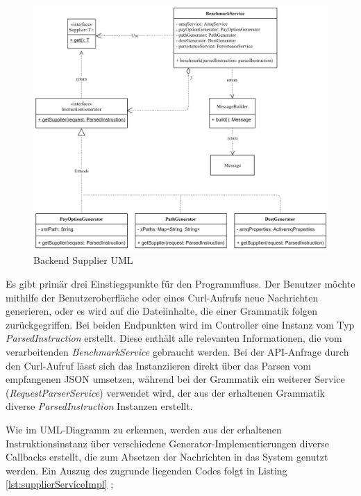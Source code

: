 \begin{figure}[ht!]
	\centering
	\includegraphics[width=\linewidth]{kapitel/problemloesung/implementierung/_img/supplier-uml}
	\caption[Backend Supplier UML]{Backend Supplier UML}
	\label{fig:supplierUml}
\end{figure}

Es gibt primär drei Einstiegspunkte für den Programmfluss. Der Benutzer möchte mithilfe der Benutzeroberfläche oder eines Curl-Aufrufs neue Nachrichten generieren, oder es wird auf die Dateiinhalte, die einer Grammatik folgen zurückgegriffen. Bei beiden Endpunkten wird im Controller eine Instanz vom Typ \emph{ParsedInstruction} erstellt. Diese enthält alle relevanten Informationen, die vom verarbeitenden \emph{BenchmarkService} gebraucht werden. Bei der API-Anfrage durch den Curl-Aufruf lässt sich das Instanziieren direkt über das Parsen vom empfangenen JSON umsetzen, während bei der Grammatik ein weiterer Service (\emph{RequestParserService}) verwendet wird, der aus der erhaltenen Grammatik diverse \emph{ParsedInstruction} Instanzen erstellt.

Wie im UML-Diagramm zu erkennen, werden aus der erhaltenen Instruktionsinstanz über verschiedene Generator-Implementierungen diverse Callbacks erstellt, die zum Absetzen der Nachrichten in das System genutzt werden. Ein Auszug des zugrunde liegenden Codes folgt in Listing \ref{lst:supplierServiceImpl} ;

